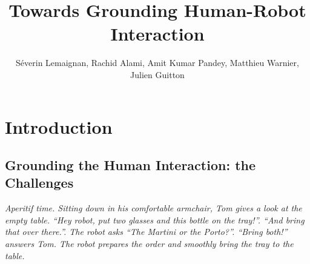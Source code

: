 \documentclass{svmult}
\begin{document}


\title*{Towards Grounding Human-Robot Interaction}

\author{
Séverin Lemaignan,
Rachid Alami,
Amit Kumar Pandey,
Matthieu Warnier,
Julien Guitton
}


\maketitle


\section{Introduction}

\subsection{Grounding the Human Interaction: the Challenges}

{\em Aperitif time. Sitting down in his comfortable armchair, Tom gives a look
at the empty table. ``{\em Hey robot, put two glasses and this bottle on the
tray!}''. ``{\em And bring that over there.}''. The robot asks ``{\em The
Martini or the Porto?}''. ``{\em Bring both!}'' answers Tom. The robot prepares
the order and smoothly bring the tray to the table.}
\end{document}
